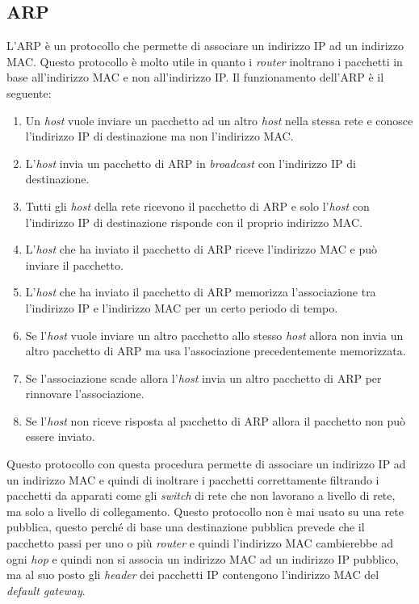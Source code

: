     \subsection[\textit{Address Resolution Protocol} (\texttt{ARP})]{\Acrfull*{ARP}}
        L'\Acrshort*{ARP} è un protocollo che permette di associare un indirizzo \Acrshort*{IP} ad un indirizzo \Acrshort*{MAC}. Questo protocollo è molto utile in quanto i \textit{router} inoltrano i pacchetti in base all'indirizzo \Acrshort*{MAC} e non all'indirizzo \Acrshort*{IP}. Il funzionamento dell'\Acrshort*{ARP} è il seguente: \begin{enumerate}
            \item Un \textit{host} vuole inviare un pacchetto ad un altro \textit{host} nella stessa rete e conosce l'indirizzo \Acrshort*{IP} di destinazione ma non l'indirizzo \Acrshort*{MAC}.
            \item L'\textit{host} invia un pacchetto di \Acrshort*{ARP} in \textit{broadcast} con l'indirizzo \Acrshort*{IP} di destinazione.
            \item Tutti gli \textit{host} della rete ricevono il pacchetto di \Acrshort*{ARP} e solo l'\textit{host} con l'indirizzo \Acrshort*{IP} di destinazione risponde con il proprio indirizzo \Acrshort*{MAC}.
            \item L'\textit{host} che ha inviato il pacchetto di \Acrshort*{ARP} riceve l'indirizzo \Acrshort*{MAC} e può inviare il pacchetto.
            \item L'\textit{host} che ha inviato il pacchetto di \Acrshort*{ARP} memorizza l'associazione tra l'indirizzo \Acrshort*{IP} e l'indirizzo \Acrshort*{MAC} per un certo periodo di tempo.
            \item Se l'\textit{host} vuole inviare un altro pacchetto allo stesso \textit{host} allora non invia un altro pacchetto di \Acrshort*{ARP} ma usa l'associazione precedentemente memorizzata.
            \item Se l'associazione scade allora l'\textit{host} invia un altro pacchetto di \Acrshort*{ARP} per rinnovare l'associazione.
            \item Se l'\textit{host} non riceve risposta al pacchetto di \Acrshort*{ARP} allora il pacchetto non può essere inviato.
        \end{enumerate}
        Questo protocollo con questa procedura permette di associare un indirizzo \Acrshort*{IP} ad un indirizzo \Acrshort*{MAC} e quindi di inoltrare i pacchetti correttamente filtrando i pacchetti da apparati come gli \textit{switch} di rete che non lavorano a livello di rete, ma solo a livello di collegamento.\newline
        Questo protocollo non è mai usato su una rete pubblica, questo perché di base una destinazione pubblica prevede che il pacchetto passi per uno o più \textit{router} e quindi l'indirizzo \Acrshort*{MAC} cambierebbe ad ogni \textit{hop} e quindi non si associa un indirizzo \Acrshort*{MAC} ad un indirizzo \Acrshort*{IP} pubblico, ma al suo posto gli \textit{header} dei pacchetti \Acrshort*{IP} contengono l'indirizzo \Acrshort*{MAC} del \textit{default gateway}.

